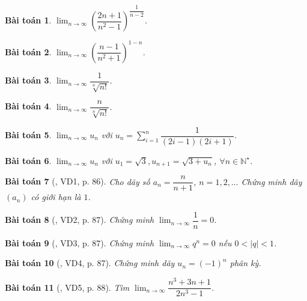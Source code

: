 \documentclass[oneside]{book}
\newtheorem{baitoan}{Bài toán}
\begin{document}
\begin{baitoan}
	$\lim_{n\to\infty} \left(\dfrac{2n + 1}{n^2 - 1}\right)^{\dfrac{1}{n - 2}}$.
\end{baitoan}

\begin{baitoan}
	$\lim_{n\to\infty} \left(\dfrac{n - 1}{n^2 + 1}\right)^{1 - n}$.
\end{baitoan}

\begin{baitoan}
	$\lim_{n\to\infty} \dfrac{1}{\sqrt[n]{n!}}$.
\end{baitoan}

\begin{baitoan}
	$\lim_{n\to\infty} \dfrac{n}{\sqrt[n]{n!}}$.
\end{baitoan}

\begin{baitoan}
	$\lim_{n\to\infty} u_n$ với $u_n = \sum_{i=1}^n \dfrac{1}{(2i - 1)(2i + 1)}$.
\end{baitoan}

\begin{baitoan}
	$\lim_{n\to\infty} u_n$ với $u_1 = \sqrt{3},u_{n+1} = \sqrt{3 + u_n}$, $\forall n\in\mathbb{N}^\star$.
\end{baitoan}

\begin{baitoan}[\cite{Hung_nang_cao_phat_trien_Toan_11_tap_1}, VD1, p. 86]
	Cho dãy số $a_n = \dfrac{n}{n + 1}$, $n = 1,2,\ldots$ Chứng minh dãy $(a_n)$ có giới hạn là $1$.
\end{baitoan}

\begin{baitoan}[\cite{Hung_nang_cao_phat_trien_Toan_11_tap_1}, VD2, p. 87]
	Chứng minh $\lim_{n\to\infty} \dfrac{1}{n} = 0$.
\end{baitoan}

\begin{baitoan}[\cite{Hung_nang_cao_phat_trien_Toan_11_tap_1}, VD3, p. 87]
	Chứng minh $\lim_{n\to\infty} q^n = 0$ nếu $0 < |q| < 1$.
\end{baitoan}

\begin{baitoan}[\cite{Hung_nang_cao_phat_trien_Toan_11_tap_1}, VD4, p. 87]
	Chứng minh dãy $u_n = (-1)^n$ phân kỳ.
\end{baitoan}

\begin{baitoan}[\cite{Hung_nang_cao_phat_trien_Toan_11_tap_1}, VD5, p. 88]
	Tìm $\lim_{n\to\infty} \dfrac{n^3 + 3n + 1}{2n^3 - 1}$.
\end{baitoan}
\end{document}
